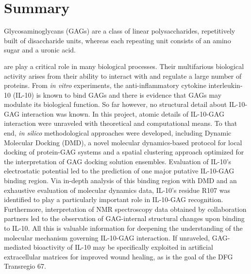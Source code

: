 \chapter{Summary}



Glycosaminoglycans (GAGs) are a class of linear polysaccharides, repetitively
built of disaccharide units, whereas each repeating unit consists of an amino
sugar and a uronic acid.

are play a critical role in many biological processes.
Their multifarious biological activity arises from their ability to interact
with and regulate a large number of proteins. From \textit{in vitro}
experiments, the anti-inflammatory cytokine interleukin-10 (IL-10) is known to
bind GAGs and there is evidence that GAGs may modulate its biological function.
So far however, no structural detail about IL-10-GAG interaction was known. In
this project, atomic details of IL-10-GAG interaction were unraveled with
theoretical and computational means. To that end, \textit{in silico}
methodological approaches were developed, including Dynamic Molecular Docking
(DMD), a novel molecular dynamics-based protocol for local docking of
protein-GAG systems and a spatial clustering approach optimized for the
interpretation of GAG docking solution ensembles. Evaluation of IL-10's
electrostatic potential led to the prediction of one major putative IL-10-GAG
binding region. Via in-depth analysis of this binding region with DMD and an
exhaustive evaluation of molecular dynamics data, IL-10's residue R107 was
identified to play a particularly important role in IL-10-GAG recognition.
Furthermore, interpretation of NMR spectroscopy data obtained by collaboration
partners led to the observation of GAG-internal structural changes upon binding
to IL-10. All this is valuable information for deepening the understanding of
the molecular mechanism governing IL-10-GAG interaction. If unraveled,
GAG-mediated bioactivity of IL-10 may be specifically exploited in artificial
extracellular matrices for improved wound healing, as is the goal of the DFG
Transregio 67.

\lipsum[1-4]